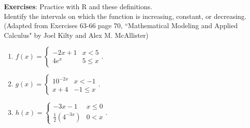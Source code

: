 \documentclass{article}
\theoremstyle{plain}
\theoremstyle{box}
\begin{document}
\vfill

\textbf{Exercises}: Practice with R and these definitions.\\ 
Identify the intervals on which the function is increasing, constant, or decreasing.
(Adapted from Exercises 63-66 page 70, ``Mathematical Modeling and Applied Calculus" by Joel Kilty and Alex M. McAllister)
\begin{enumerate}
\item $f(x) = \begin{cases} 
      -2x + 1 & x < 5 \\
      4e^x & 5 \leq x
   \end{cases}.$
\item $g(x) = \begin{cases} 
      10^{-2x} & x < -1 \\
      x + 4 & -1 \leq x
   \end{cases}.$
\item $h(x) = \begin{cases} 
      -3x -1 & x \leq 0 \\
      \frac{1}{2}(4^{-3x}) & 0 < x
   \end{cases}.$
\end{enumerate}
\end{document}
